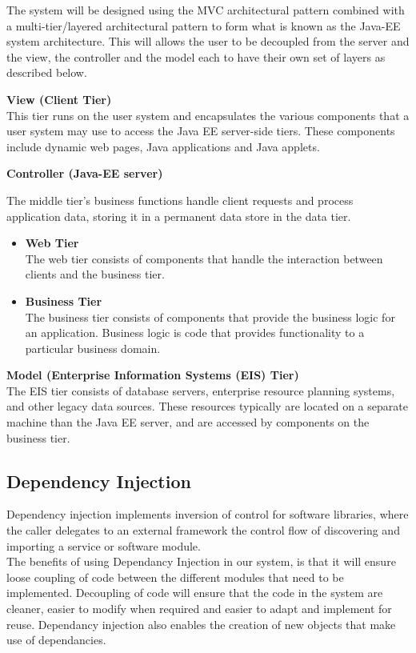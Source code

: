 \begin{flushleft}
The system will be designed using the MVC architectural pattern combined
with a multi-tier/layered architectural pattern to form what is known as the Java-EE system architecture.
This will allows the user to be decoupled from the server and the view, the controller and the model each 
to have their own set of layers as described below.

\textbf{View (Client Tier)}\\
This tier runs on the user system and encapsulates the various components that a user system may use to access the Java EE server-side tiers. These components include dynamic web pages, Java applications and Java applets. 

\textbf{Controller (Java-EE server)}

The middle tier's business functions handle client requests and process application data, storing it in a permanent data store in the data tier.

\begin{itemize}
	\item \textbf{Web Tier}
	\\The web tier consists of components that handle the interaction between clients and the business tier.
	
	\item \textbf{Business Tier}
	\\The business tier consists of components that provide the business logic for an application. Business logic is code that provides functionality to a particular business domain.
\end{itemize}

\textbf{Model (Enterprise Information Systems (EIS) Tier)}\\
The EIS tier consists of database servers, enterprise resource planning systems, and other legacy data sources. These resources typically are located on a separate machine than the Java EE server, and are accessed by components on the business tier.

\end{flushleft}

\subsection{Dependency Injection}

\begin{flushleft}

Dependency injection implements inversion of control for software libraries, where the caller delegates to an external framework the control flow of discovering and importing a service or software module.\\
The benefits of using Dependancy Injection in our system, is that it will ensure loose coupling of code between the different modules that need to be implemented. Decoupling of code will ensure that the code in the system are cleaner, easier to modify when required and easier to adapt and implement for reuse. Dependancy injection also enables the creation of new objects that make use of dependancies.
\end{flushleft}


